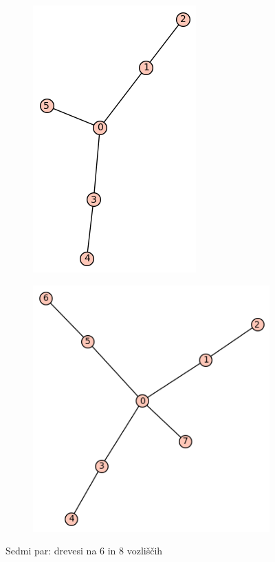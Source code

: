 \documentclass[12pt, a4paper]{article}
\begin{document}
\begin{center}
\begin{center}
\begin{figure}[!htb]
\centering
\begin{subfigure}{0.5\textwidth}
  \centering
  \includegraphics[width=0.4\linewidth]{t-11}
\end{subfigure}%
\begin{subfigure}{0.5\textwidth}
  \centering
  \includegraphics[width=0.5\linewidth]{t-44}
\end{subfigure}
\caption{Sedmi par: drevesi na 6 in 8 vozliščih}
\label{fig:test}
\end{figure}
\end{center}


\end{center}
\end{document}
